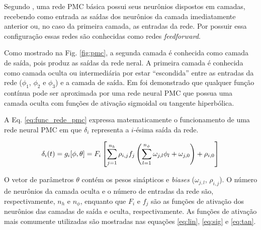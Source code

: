 Segundo , uma rede PMC básica possui seus neurônios
dispostos em camadas, recebendo como entrada as saídas dos neurônios da camada
imediatamente anterior ou, no caso da primeira camada, as entradas da rede. Por
possuir essa configuração essas redes são conhecidas como redes {\it
feedforward}.

Como mostrado na Fig. \ref{fig:pmc}, a segunda camada é conhecida como camada
de saída, pois produz as saídas da rede neral. A primeira camada é conhecida
como camada oculta ou intermediária por estar ``escondida'' entre as entradas da
rede ($\phi_1$, $\phi_2$ e $\phi_3$) e a camada de saída. Em
 foi demonstrado que qualquer função contínua pode ser
aproximada por uma rede neural PMC que possua uma camada oculta com funções de
ativação sigmoidal ou tangente hiperbólica.

A Eq. \ref{eq:func_rede_pmc} expressa matematicamente o funcionamento de uma
rede neural PMC em que $\delta_i$ representa a $i$-ésima saída da rede.

\begin{equation}\label{eq:func_rede_pmc}
\delta_i(t) = g_i[\phi,\theta] =
              F_i\left[\sum_{j=1}^{n_h}\rho_{i,j}f_j
              \left(\sum_{l=1}^{n_\phi}\omega_{j,l}\phi_l+\omega_{j,0}\right)+
              \rho_{i,0}\right]
\end{equation}

O vetor de parâmetros $\theta$ contém os pesos sinápticos e {\it biases}
($\omega_{j,l}$, $\rho_{i,j}$). O número de neurônios da camada oculta e o
número de entradas da rede são, respectivamente, $n_h$ e $n_\phi$, enquanto que
$F_i$ e $f_j$ são as funções de ativação dos neurônios das camadas de saída e
oculta, respectivamente. As funções de ativação mais comumente utilizadas são
mostradas nas equações \ref{eq:lin}, \ref{eq:sig} e \ref{eq:tan}.

